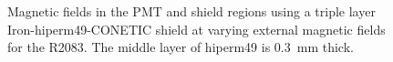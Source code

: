 \documentclass[12pt]{article}
\begin{document}
\begin{figure}[ht]
\qquad
{}
\caption{\small{Magnetic fields in the PMT and shield regions using a triple layer Iron-hiperm49-CONETIC shield at varying external magnetic fields for the R2083. The middle layer of hiperm49 is 0.3~mm thick.}}\label{R2083_Initial_Iron}
\end{figure}
\clearpage
\newpage

\end{document}
